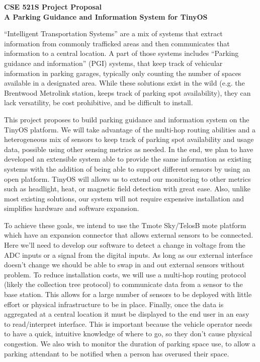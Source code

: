 \documentclass[12pt]{article}
\begin{document}
\begin{center}
{\bf \large CSE 521S Project Proposal\\
A Parking Guidance and Information System for TinyOS}
\end{center}

``Intelligent Transportation Systems'' are a mix of systems that extract
information from commonly trafficked areas and then communicates that
information to a central location.
A part of those systems includes ``Parking guidance and information'' (PGI)
systems, that keep track of vehicular information in parking garages, typically
only counting the number of spaces available in a designated area.
While these solutions exist in the wild (e.g. the Brentwood Metrolink station,
keeps track of parking spot availability), they can lack versatility, 
be cost prohibitive, and be difficult to install.

This project proposes to build parking guidance and information system on the
TinyOS platform.
We will take advantage of the multi-hop routing abilities and a heterogeneous
mix of sensors to keep track of parking spot availability and usage data,
possible using other sensing metrics as needed.
In the end, we plan to have developed an extensible system able to provide the
same information as existing systems with the addition of being able to
support different sensors by using an open platform.
TinyOS will allows us to extend our monitoring to other metrics such as
headlight, heat, or magnetic field detection with great ease.
Also, unlike most existing solutions, our system will not require expensive
installation and simplifies hardware and software expansion.

To achieve these goals, we intend to use the Tmote Sky/TelosB mote platform
which have an expansion connector that allows external sensors to be connected.
Here we'll need to develop our software to detect a change in voltage from the
ADC inputs or a signal from the digital inputs.
As long as our external interface doesn't change we should be able to swap in
and out external sensors without problem.
To reduce installation costs, we will use a multi-hop routing protocol (likely
the collection tree protocol) to communicate data from a sensor to the base
station.
This allows for a large number of sensors to be deployed with little effort or
physical infrastructure to be in place.
Finally, once the data is aggregated at a central location it must be displayed
to the end user in an easy to read/interpret interface.
This is important because the vehicle operator needs to have a quick, intuitive
knowledge of where to go, so they don't cause physical congestion.
We also wish to monitor the duration of parking space use, to allow a parking
attendant to be notified when a person has overused their space.
\end{document}
